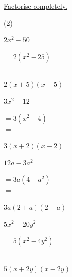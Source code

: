 
\noindent \hyperlink{url09A}{Factorise completely.}
\begin{tasks}(2)
    \task \begin{exercise}$2x^2-50$
              \begin{envSolution}
                 $ =2(x^2-25)   $\\ 
                 $ =$			 
                     \begin{shortsolution}
  	                    $ 2(x+5)(x-5)$
                     \end{shortsolution}
              \end{envSolution}%
          \end{exercise}
 
    \task \begin{exercise}$3x^2-12$
              \begin{envSolution}
                 $ =3(x^2-4)   $\\ 
                 $ =$			 
                     \begin{shortsolution}
  	                    $ 3(x+2)(x-2)$
                     \end{shortsolution}
              \end{envSolution}%
          \end{exercise}
 
    \task \begin{exercise}$12a-3a^2$
              \begin{envSolution}
                 $ =3a(4-a^2)   $\\ 
                 $ =$			 
                     \begin{shortsolution}
  	                    $ 3a(2+a)(2-a)$
                     \end{shortsolution}
              \end{envSolution}%
          \end{exercise}

    \task \begin{exercise}$5x^2-20y^2$
              \begin{envSolution}
                 $ =5(x^2-4y^2)   $\\
                 $ =$			 
                     \begin{shortsolution}
  	                    $ 5(x+2y)(x-2y)$
                     \end{shortsolution}
              \end{envSolution}%
          \end{exercise}
 

\end{tasks}
